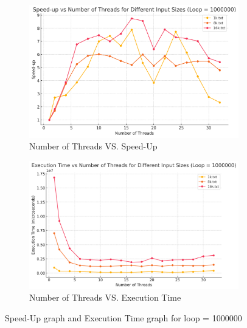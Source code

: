 \documentclass[letterpaper,12pt]{article}
\theoremstyle{remark}
\begin{document}
\hfill  %

\begin{figure}[H]
    \centering
    \begin{subfigure}[t]{0.48\textwidth}  %
        \centering
        \includegraphics[width=\textwidth]{loop1000000Sleep.png}
        \caption{Number of Threads VS. Speed-Up}
        \label{fig:ThreadVsSpeedUp1}
    \end{subfigure}
    \hfill  %
    \begin{subfigure}[t]{0.48\textwidth}  %
        \centering
        \includegraphics[width=\textwidth]{loop1000000ExecutionTime.png}
        \caption{Number of Threads VS. Execution Time}
        \label{fig:ThreadVsExecutionTime}
    \end{subfigure}
    \caption{Speed-Up graph and Execution Time graph for loop = 1000000}
    \label{fig:ThreadVsComparison}
\end{figure}
\end{document}
